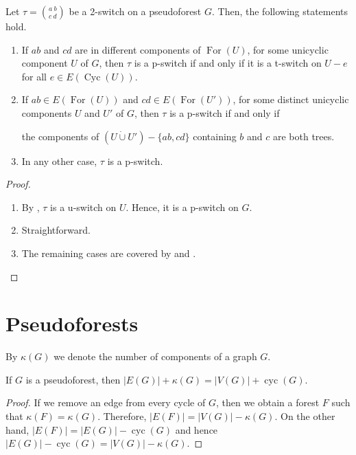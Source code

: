 \documentclass{BICA}
\newcommand{\cycles}{\operatorname{cyc}}
\newcommand{\Forest}{\operatorname{For}}
\newcommand{\Cycles}{\operatorname{Cyc}}
\begin{document}
\begin{theorem}
	\label{pswitchcaract}

	Let $\tau= {{a \ b}\choose{c \ d}}$ be a 2-switch on a pseudoforest $G$. Then, the following statements hold.
	\begin{enumerate}
		\item If \(ab\) and \(cd\) are in different components of \(\Forest(U)\), for some unicyclic component \(U\) of \(G\), then \(\tau\) is a p-switch if and only if it is a t-switch on \( U-e\) for all \(e \in E(\Cycles(U))\).

		\item If \( ab \in E(\Forest(U))\) and \(cd \in E(\Forest(U'))\), for some distinct unicyclic components \(U\) and \( U'\) of \(G\), then \(\tau\) is a p-switch if and only if

		the components of $(U\dot{\cup}U')-\{ab,cd\}$ containing $b$ and $c$ are both trees.

		\item In any other case, \(\tau\) is a p-switch.
	\end{enumerate}
\end{theorem}

\begin{proof}
	\begin{enumerate}[label=(\arabic*).]
		\item By , $\tau$ is a u-switch on $U$. Hence, it is a p-switch on $G$.

		\item Straightforward.

		\item The remaining cases are covered by  and . \qedhere
	\end{enumerate}
\end{proof}

\section{Pseudoforests} \label{sec-pesudoforest}

By $\kappa(G)$ we denote the number of components of a graph $G$.

\begin{lemma}
	\label{pseudosize}

	If $G$ is a pseudoforest, then $|E(G)|+\kappa(G)=|V(G)|+\cycles(G)$.
\end{lemma}

\begin{proof}
If we remove an edge from every cycle of $G$, then we obtain a forest $F$ such that $\kappa(F)=\kappa(G)$. Therefore, $|E(F)|=|V(G)|-\kappa(G)$. On the other hand, $|E(F)|=|E(G)|-\cycles(G)$ and hence $|E(G)|-\cycles(G)=|V(G)|-\kappa(G)$.
\end{proof}
\end{document}
